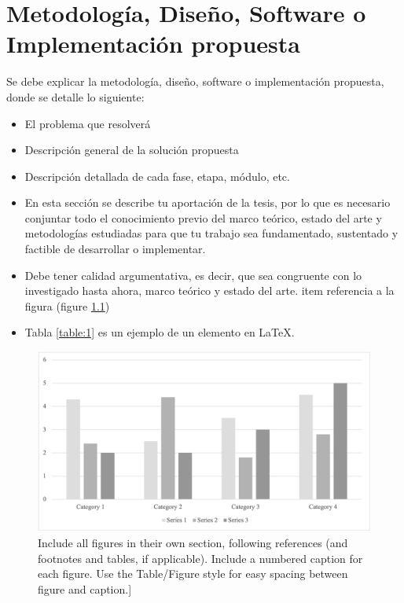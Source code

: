 \chapter{Metodología, Diseño, Software o Implementación propuesta}\label{Cap_02}
\lettrine[lines=2,nindent=0pt]{S}{}e debe explicar la metodología, diseño, software o implementación propuesta, donde se detalle lo siguiente:

\begin{itemize}
\item El problema que resolverá
\item Descripción general de la solución propuesta
\item Descripción detallada de cada fase, etapa, módulo, etc.
\item En esta sección se describe tu aportación de la tesis, por lo que es necesario conjuntar todo el conocimiento previo del marco teórico, estado del arte y metodologías estudiadas para que tu trabajo sea fundamentado, sustentado y factible de desarrollar o implementar.
\item Debe tener calidad argumentativa, es decir, que sea congruente con lo investigado hasta ahora, marco teórico y estado del arte.
item referencia a la figura (figure \ref{fig:figure})
\item Tabla \ref{table:1} es un ejemplo de un elemento en \LaTeX{}.

\end{itemize}

\begin{figure}[H]
    \begin{center}
    \includegraphics[width=.8\textwidth]{Cap_02/grafica.png}\caption[Metodología CRISP-DM]{Include all figures in their own section, following references (and footnotes and tables, if applicable).  Include a numbered caption for each figure.  Use the Table/Figure style for easy spacing between figure and caption.]}\label{fig:figure}
    \end{center}
    \end{figure}



